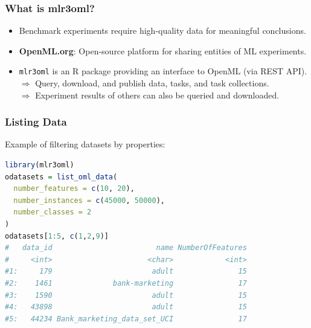 \documentclass[11pt,compress,t,notes=noshow, aspectratio=169, xcolor=table]{beamer}
\begin{document}
\begin{frame}[fragile]
\frametitle{What is mlr3oml?}


\begin{itemize}
  \item Benchmark experiments require high-quality data for meaningful conclusions.
  \item \textbf{OpenML.org}: Open-source platform for sharing entities of ML experiments.
  \item \texttt{mlr3oml} is an R package providing an interface to OpenML (via  REST API).\\
  $\Rightarrow$ Query, download, and publish data, tasks, and task collections.\\
  $\Rightarrow$ Experiment results of others can also be queried and downloaded.
\end{itemize}

\end{frame}

\begin{frame}[fragile]
\frametitle{Listing Data}
Example of filtering datasets by properties:
\begin{lstlisting}[language=R]
library(mlr3oml)
odatasets = list_oml_data(
  number_features = c(10, 20),
  number_instances = c(45000, 50000),
  number_classes = 2
)
odatasets[1:5, c(1,2,9)]
#   data_id                        name NumberOfFeatures
#     <int>                      <char>            <int>
#1:     179                       adult               15
#2:    1461              bank-marketing               17
#3:    1590                       adult               15
#4:   43898                       adult               15
#5:   44234 Bank_marketing_data_set_UCI               17
\end{lstlisting}
\end{frame}
\end{document}
